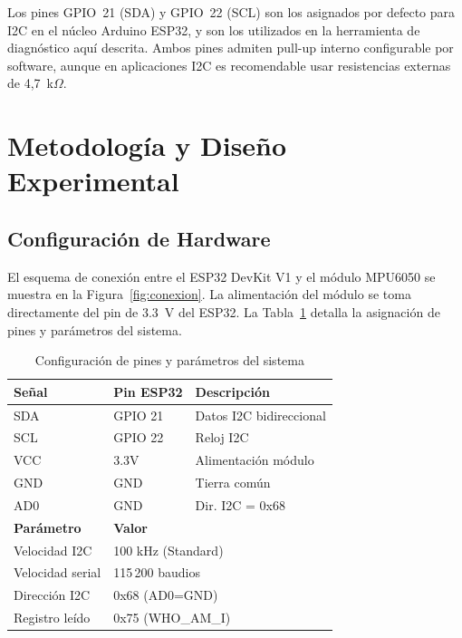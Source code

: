 \documentclass[10pt,twocolumn,a4paper]{article}
\begin{document}
Los pines GPIO~21 (SDA) y GPIO~22 (SCL) son los asignados por defecto
para I2C en el núcleo Arduino ESP32, y son los utilizados en la
herramienta de diagnóstico aquí descrita. Ambos pines admiten pull-up
interno configurable por software, aunque en aplicaciones I2C es
recomendable usar resistencias externas de 4,7~k$\Omega$.

\section{Metodología y Diseño Experimental}
\label{sec:metodo}

\subsection{Configuración de Hardware}

El esquema de conexión entre el ESP32 DevKit V1 y el módulo MPU6050 se
muestra en la Figura~\ref{fig:conexion}. La alimentación del módulo se
toma directamente del pin de 3.3~V del ESP32. La Tabla~\ref{tab:pins}
detalla la asignación de pines y parámetros del sistema.

\begin{table}[H]
\centering
\caption{Configuración de pines y parámetros del sistema}
\label{tab:pins}
\scriptsize
\begin{tabular}{p{1.8cm}p{1.5cm}p{2.8cm}}
\toprule
\textbf{Señal} & \textbf{Pin ESP32} & \textbf{Descripción} \\
\midrule
SDA & GPIO 21 & Datos I2C bidireccional \\
SCL & GPIO 22 & Reloj I2C \\
VCC & 3.3V & Alimentación módulo \\
GND & GND & Tierra común \\
AD0 & GND & Dir. I2C = 0x68 \\
\midrule
\textbf{Parámetro} & \multicolumn{2}{l}{\textbf{Valor}} \\
\midrule
Velocidad I2C & \multicolumn{2}{l}{100 kHz (Standard)} \\
Velocidad serial & \multicolumn{2}{l}{115\,200 baudios} \\
Dirección I2C & \multicolumn{2}{l}{0x68 (AD0=GND)} \\
Registro leído & \multicolumn{2}{l}{0x75 (WHO\_AM\_I)} \\
\bottomrule
\end{tabular}
\end{table}
\end{document}
